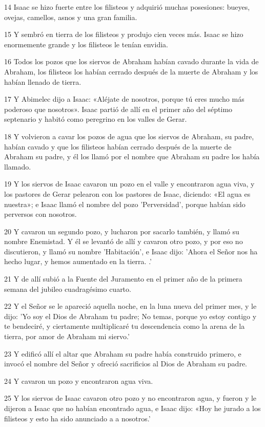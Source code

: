 \par 14 Isaac se hizo fuerte entre los filisteos y adquirió muchas posesiones: bueyes, ovejas, camellos, asnos y una gran familia.
\par 15 Y sembró en tierra de los filisteos y produjo cien veces más. Isaac se hizo enormemente grande y los filisteos le tenían envidia.
\par 16 Todos los pozos que los siervos de Abraham habían cavado durante la vida de Abraham, los filisteos los habían cerrado después de la muerte de Abraham y los habían llenado de tierra.
\par 17 Y Abimelec dijo a Isaac: «Aléjate de nosotros, porque tú eres mucho más poderoso que nosotros». Isaac partió de allí en el primer año del séptimo septenario y habitó como peregrino en los valles de Gerar.
\par 18 Y volvieron a cavar los pozos de agua que los siervos de Abraham, su padre, habían cavado y que los filisteos habían cerrado después de la muerte de Abraham su padre, y él los llamó por el nombre que Abraham su padre los había llamado.
\par 19 Y los siervos de Isaac cavaron un pozo en el valle y encontraron agua viva, y los pastores de Gerar pelearon con los pastores de Isaac, diciendo: «El agua es nuestra»; e Isaac llamó el nombre del pozo 'Perversidad', porque habían sido perversos con nosotros.
\par 20 Y cavaron un segundo pozo, y lucharon por sacarlo también, y llamó su nombre Enemistad. Y él se levantó de allí y cavaron otro pozo, y por eso no discutieron, y llamó su nombre 'Habitación', e Isaac dijo: 'Ahora el Señor nos ha hecho lugar, y hemos aumentado en la tierra. .'
\par 21 Y de allí subió a la Fuente del Juramento en el primer año de la primera semana del jubileo cuadragésimo cuarto.
\par 22 Y el Señor se le apareció aquella noche, en la luna nueva del primer mes, y le dijo: 'Yo soy el Dios de Abraham tu padre; No temas, porque yo estoy contigo y te bendeciré, y ciertamente multiplicaré tu descendencia como la arena de la tierra, por amor de Abraham mi siervo.'
\par 23 Y edificó allí el altar que Abraham su padre había construido primero, e invocó el nombre del Señor y ofreció sacrificios al Dios de Abraham su padre.
\par 24 Y cavaron un pozo y encontraron agua viva.
\par 25 Y los siervos de Isaac cavaron otro pozo y no encontraron agua, y fueron y le dijeron a Isaac que no habían encontrado agua, e Isaac dijo: «Hoy he jurado a los filisteos y esto ha sido anunciado a a nosotros.'
